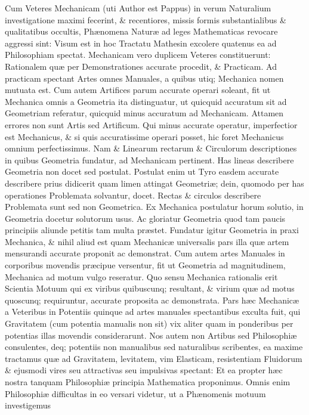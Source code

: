 \documentclass{ansarticle}
\begin{document}
Cum Veteres Mechanicam (uti Author est Pappus) in verum Naturalium
investigatione maximi fecerint, \& recentiores, missis formis
substantialibus \& qualitatibus occultis, Ph\ae{}nomena Natur\ae{} ad leges
Mathematicas revocare aggressi sint: Visum est in hoc Tractatu
Mathesin excolere quatenus ea ad Philosophiam spectat. Mechanicam vero
duplicem Veteres constituerunt: Rationalem qu\ae{} per Demonstrationes
accurate procedit, \& Practicam. Ad practicam spectant Artes omnes
Manuales, a quibus utiq; Mechanica nomen mutuata est. Cum autem
Artifices parum accurate operari soleant, fit ut Mechanica omnis a
Geometria ita distinguatur, ut quicquid accuratum sit ad Geometriam
referatur, quicquid minus accuratum ad Mechanicam. Attamen errores non
sunt Artis sed Artificum. Qui minus accurate operatur, imperfectior
est Mechanicus, \& si quis accuratissime operari posset, hic foret
Mechanicus omnium perfectissimus. Nam \& Linearum rectarum \& Circulorum
descriptiones in quibus Geometria fundatur, ad Mechanicam
pertinent. Has lineas describere Geometria non docet sed
postulat. Postulat enim ut Tyro easdem accurate describere prius
didicerit quam limen attingat Geometri\ae{}; dein, quomodo per has
operationes Problemata solvantur, docet. Rectas \& circulos describere
Problemata sunt sed non Geometrica. Ex Mechanica postulatur horum
solutio, in Geometria docetur solutorum usus. Ac gloriatur Geometria
quod tam paucis principiis aliunde petitis tam multa pr\ae{}stet. Fundatur
igitur Geometria in praxi Mechanica, \& nihil aliud est quam Mechanic\ae{}
universalis pars illa qu\ae{} artem mensurandi accurate proponit ac
demonstrat. Cum autem artes Manuales in corporibus movendis pr\ae{}cipue
versentur, fit ut Geometria ad magnitudinem, Mechanica ad motum vulgo
reseratur. Quo sensu Mechanica rationalis erit Scientia Motuum qui ex
viribus quibuscunq; resultant, \& virium qu\ae{} ad motus quoscunq;
requiruntur, accurate proposita ac demonstrata. Pars h\ae{}c Mechanic\ae{} a
Veteribus in Potentiis quinque ad artes manuales spectantibus exculta
fuit, qui Gravitatem (cum potentia manualis non sit) vix aliter quam
in ponderibus per potentias illas movendis considerarunt. Nos autem
non Artibus sed Philosophi\ae{} consulentes, deq; potentiis non manualibus
sed naturalibus scribentes, ea maxime tractamus qu\ae{} ad Gravitatem,
levitatem, vim Elasticam, resistentiam Fluidorum \& ejusmodi vires seu
attractivas seu impulsivas spectant: Et ea propter h\ae{}c nostra tanquam
Philosophi\ae{} principia Mathematica proponimus. Omnis enim Philosophi\ae{}
difficultas in eo versari videtur, ut a Ph\ae{}nomenis motuum investigemus
\end{document}
